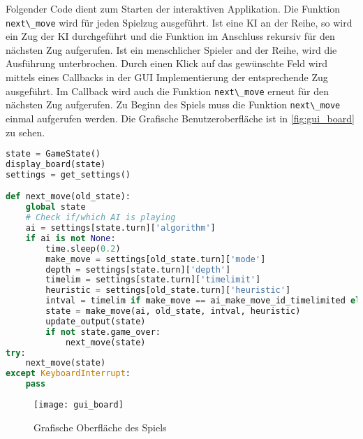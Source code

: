 Folgender Code dient zum Starten der interaktiven Applikation. Die
Funktion \passthrough{\lstinline!next\_move!} wird für jeden Spielzug
ausgeführt. Ist eine \ac{KI} an der Reihe, so wird ein Zug der \ac{KI}
durchgeführt und die Funktion im Anschluss rekursiv für den nächsten Zug
aufgerufen. Ist ein menschlicher Spieler and der Reihe, wird die
Ausführung unterbrochen. Durch einen Klick auf das gewünschte Feld wird
mittels eines Callbacks in der GUI Implementierung der entsprechende Zug
ausgeführt. Im Callback wird auch die Funktion
\passthrough{\lstinline!next\_move!} erneut für den nächsten Zug
aufgerufen. Zu Beginn des Spiels muss die Funktion
\passthrough{\lstinline!next\_move!} einmal aufgerufen werden. Die
Grafische Benutzeroberfläche ist in \autoref{fig:gui_board} zu sehen.

\begin{lstlisting}[language=Python]
state = GameState()
display_board(state)
settings = get_settings()

def next_move(old_state):
    global state
    # Check if/which AI is playing
    ai = settings[state.turn]['algorithm']
    if ai is not None:
        time.sleep(0.2)
        make_move = settings[old_state.turn]['mode']
        depth = settings[state.turn]['depth']
        timelim = settings[state.turn]['timelimit']
        heuristic = settings[old_state.turn]['heuristic']
        intval = timelim if make_move == ai_make_move_id_timelimited else depth
        state = make_move(ai, old_state, intval, heuristic)
        update_output(state)
        if not state.game_over:
            next_move(state)
try:
    next_move(state)
except KeyboardInterrupt:
    pass
\end{lstlisting}

\begin{figure}[H]
    \centering
    \texttt{[image: gui\_board]}
    \caption{Grafische Oberfläche des Spiels}
    \label{fig:gui_board}
\end{figure}
